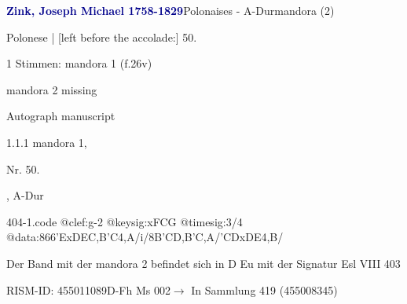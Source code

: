 \documentclass[twocolumn, 12pt]{book}
\begin{document}
\par \vspace{16pt} \textcolor{darkblue}{\textbf{Zink, Joseph Michael  1758-1829}}\hfillplus{\textbf{[404]}}\newline Polonaises - A-Dur\newline mandora (2)
\par \begin{itshape}[f.26v, at left:] Polonese | [left before the accolade:] 50.\end{itshape} 
\par \textcolor{darkblue}{}  1 Stimmen: mandora 1  (f.26v)\newline \begin{small} mandora 2 missing\end{small} \newline Autograph manuscript
\par 1.1.1  mandora 1, \begin{itshape}Nr. 50.\end{itshape}, A-Dur  
\begin{filecontents*}{404-1.code}
@clef:g-2
@keysig:xFCG
@timesig:3/4
@data:{866'ExDE}{C,B'C}4,A/i/8{B'C}{D,B}{'C,A}/{'CD}{xDE}4,B/
\end{filecontents*}
\newline %
\par Der Band mit der mandora 2 befindet sich in D Eu mit der Signatur Esl VIII 403
\par RISM-ID: 455011089\newline D-Fh  Ms 002\newline $\rightarrow$ In Sammlung 419 (455008345)
      
\end{document}
